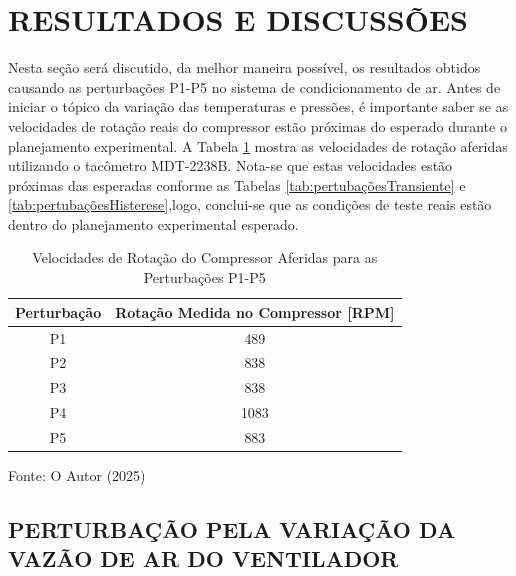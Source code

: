 \section{RESULTADOS E DISCUSSÕES}

Nesta seção será discutido, da melhor maneira possível, os resultados obtidos causando as perturbações P1-P5 no sistema de condicionamento de ar. Antes de iniciar o tópico da variação das temperaturas e pressões, é importante saber se as velocidades de rotação reais do compressor estão próximas do esperado durante o planejamento experimental. A Tabela \ref{tab:Rotações Medidas} mostra as velocidades de rotação aferidas utilizando o tacômetro MDT-2238B. Nota-se que estas velocidades estão próximas das esperadas conforme as Tabelas \ref{tab:pertubaçõesTransiente} e \ref{tab:pertubaçõesHisterese},logo, conclui-se que as condições de teste reais estão dentro do planejamento experimental esperado.

\begin{table}[htb]
    \centering
    \begin{tabular}{|c|c|}
        \hline
        \textbf{Perturbação} & \textbf{Rotação Medida no Compressor [RPM]} \\
        \hline
        P1 & 489 \\
        P2 & 838 \\
        P3 & 838 \\        
        P4 & 1083 \\
        P5 & 883 \\
        \hline
    \end{tabular}
    \caption{Velocidades de Rotação do Compressor Aferidas para as Perturbações P1-P5}
    \vspace{5pt} 
{\footnotesize Fonte: O Autor (2025) }
    \label{tab:Rotações Medidas}
\end{table}

\subsection{\MakeUppercase{Perturbação pela Variação da Vazão de Ar do Ventilador}} \label{subsec:PertubaçãoVelVentilador}

